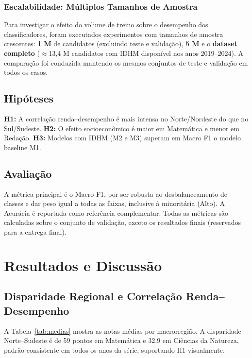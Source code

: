 \documentclass[12pt]{article}
\begin{document}
\subsubsection{Escalabilidade: Múltiplos Tamanhos de Amostra}

Para investigar o efeito do volume de treino sobre o desempenho dos
classificadores, foram executados experimentos com tamanhos de amostra
crescentes: \textbf{1 M} de candidatos (excluindo teste e validação),
\textbf{5 M} e o \textbf{dataset completo} ($\approx$13,4 M candidatos
com IDHM disponível nos anos 2019--2024). A comparação foi conduzida
mantendo os mesmos conjuntos de teste e validação em todos os casos.

\subsection{Hipóteses}

\textbf{H1:} A correlação renda--desempenho é mais intensa no
Norte/Nordeste do que no Sul/Sudeste.
\textbf{H2:} O efeito socioeconômico é maior em Matemática e menor em
Redação.
\textbf{H3:} Modelos com IDHM (M2 e M3) superam em Macro F1 o modelo
baseline M1.

\subsection{Avaliação}

A métrica principal é o Macro F1, por ser robusta ao desbalanceamento de
classes e dar peso igual a todas as faixas, inclusive à minoritária
(Alto). A Acurácia é reportada como referência complementar. Todas as
métricas são calculadas sobre o conjunto de validação, exceto os
resultados finais (reservados para a entrega final).

\section{Resultados e Discussão}

\subsection{Disparidade Regional e Correlação Renda--Desempenho}

A Tabela~\ref{tab:medias} mostra as notas médias por macrorregião. A
disparidade Norte--Sudeste é de 59 pontos em Matemática e 32,9 em
Ciências da Natureza, padrão consistente em todos os anos da série,
suportando H1 visualmente.
\end{document}
